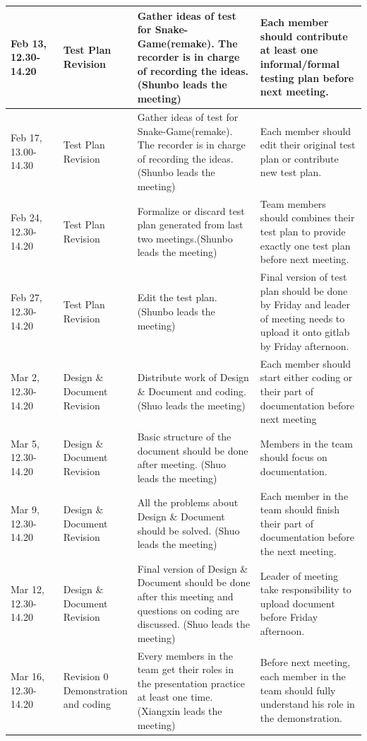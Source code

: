 \documentclass{article}
\begin{document}
        \begin{tabular}{ |p{0.15\linewidth}|p{0.20\linewidth}|p{0.35\linewidth}|p{0.30\linewidth}| }
        \hline
        Feb 13, 12.30-14.20 & Test Plan Revision & Gather ideas of test for Snake-Game(remake). The recorder is in charge of recording the ideas.(Shunbo leads the meeting) & Each member should contribute at least one informal/formal testing plan before next meeting. \\
        \hline
        Feb 17, 13.00-14.30 & Test Plan Revision & Gather ideas of test for Snake-Game(remake). The recorder is in charge of recording the ideas.(Shunbo leads the meeting) & Each member should edit their original test plan or contribute new test plan. \\
        \hline
        Feb 24, 12.30-14.20 & Test Plan Revision & Formalize or discard test plan generated from last two meetings.(Shunbo leads the meeting) & Team members should combines their test plan to provide exactly one test plan before next meeting. \\
        \hline
        Feb 27, 12.30-14.20 & Test Plan Revision & Edit the test plan.(Shunbo leads the meeting) & Final version of test plan should be done by Friday and leader of meeting needs to upload it onto gitlab by Friday afternoon. \\
         \hline
        Mar 2, 12.30-14.20 & Design \& Document Revision & Distribute work of Design \& Document and coding. (Shuo leads the meeting) & Each member should start either coding or their part of documentation before next meeting \\
         \hline
        Mar 5, 12.30-14.20 & Design \& Document Revision & Basic structure of the document should be done after meeting. (Shuo leads the meeting) & Members in the team should focus on documentation. \\
         \hline
        Mar 9, 12.30-14.20 & Design \& Document Revision & All the problems about Design \& Document should be solved. (Shuo leads the meeting) & Each member in the team should finish their part of documentation before the next meeting. \\
         \hline
        Mar 12, 12.30-14.20 & Design \& Document Revision & Final version of Design \& Document should be done after this meeting and questions on coding are discussed. (Shuo leads the meeting) & Leader of meeting take responsibility to upload document before Friday afternoon. \\
         \hline
        Mar 16, 12.30-14.20 & Revision 0 Demonstration and coding & Every members in the team get their roles in the presentation practice at least one time. (Xiangxin leads the meeting) & Before next meeting, each member in the team should fully understand his role in the demonstration. \\
        \hline
        \end{tabular}
\end{document}
